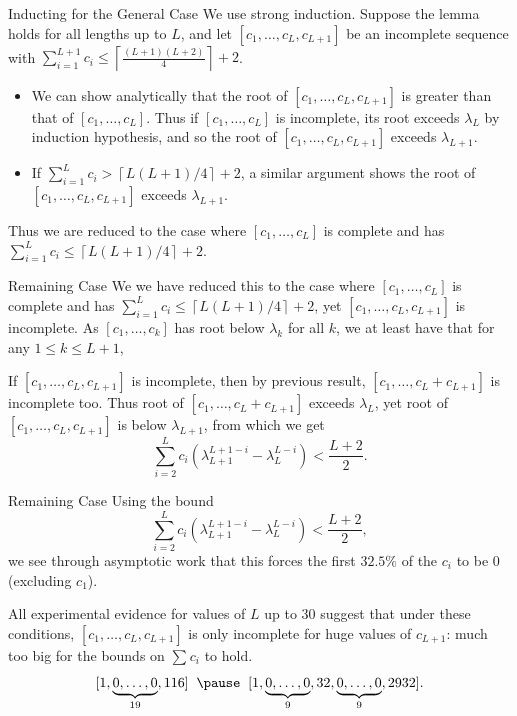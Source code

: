 \documentclass{beamer}
\begin{document}
\begin{frame}{Inducting for the General Case}
	We use strong induction. Suppose the lemma holds for all lengths up to $L$, and let $[c_1,\ldots , c_{L},c_{L+1}]$ be an incomplete sequence with $\sum_{i=1}^{L+1}c_{i}\leq \left\lceil \frac{\left( L+1 \right) \left( L+2 \right) }{4} \right\rceil +2$.
	\pause
	\begin{itemize}
	\item
		We can show analytically that the root of $[c_1,\ldots , c_{L},c_{L+1}]$ is greater than that of $[c_1,\ldots , c_{L}]$. Thus if $[c_1,\ldots , c_{L}]$ is incomplete, its root exceeds $\lambda _{L}$ by induction hypothesis, and so the root of $[c_1,\ldots , c_{L},c_{L+1}]$ exceeds $\lambda _{L+1}.$
		\pause
	\item
		If $\sum_{i=1}^{L}c_{i}>\left\lceil L(L+1)/4 \right\rceil +2$, a similar argument shows the root of $[c_1,\ldots , c_{L},c_{L+1}]$ exceeds $\lambda _{L+1}.$ 	
		\pause
	\end{itemize}
	Thus we are reduced to the case where $[c_1,\ldots , c_{L}]$ is complete and has $\sum_{i=1}^{L}c_{i}\leq \left\lceil L(L+1)/4 \right\rceil +2$.
\end{frame}
\begin{frame}{Remaining Case}
	We we have reduced this to the case where $[c_1,\ldots , c_{L}]$ is complete and has $\sum_{i=1}^{L}c_{i}\leq \left\lceil L(L+1)/4 \right\rceil +2$, yet $[c_1,\ldots ,c_{L}, c_{L+1}]$ is incomplete. \pause As $[c_1,\ldots , c_{k}]$ has root below $\lambda _{k}$ for all $k$, we at least have that for any $1\leq k\leq L+1$,
\begin{center}\end{center}
\pause
If $[c_1,\ldots , c_{L},c_{L+1}]$ is incomplete, then by previous result, $[c_1,\ldots , c_{L}+c_{L+1}]$ is incomplete too. Thus root of $[c_1,\ldots , c_{L}+c_{L+1}]$ exceeds $\lambda _{L}$, yet root of $[c_1,\ldots , c_{L}, c_{L+1}]$ is below $\lambda _{L+1}$, from which we get
\[
	\sum_{i=2}^{L}c_{i}\left( \lambda _{L+1}^{L+1-i}-\lambda _{L}^{L-i} \right) <\frac{L+2}{2}
.\] 
\end{frame}
\begin{frame}{Remaining Case}
	Using the bound
	\[
	\sum_{i=2}^{L}c_{i}\left( \lambda _{L+1}^{L+1-i}-\lambda _{L}^{L-i} \right) <\frac{L+2}{2}
,\] 
we see through asymptotic work that this forces the first $32.5 \%$ of the $c_{i}$ to be 0 (excluding $c_1$).
\pause

All experimental evidence for values of $L$ up to 30 suggest that under these conditions,  $[c_1,\ldots , c_{L},c_{L+1}]$ is only incomplete for huge values of $c_{L+1}$: much too big for the bounds on $\sum_{}^{}c_{i} $ to hold.
\pause
\[
	[1,\underbrace{0,\ldots , 0}_{19},116] \; \;  \pause \; \; [1,\underbrace{0,\ldots , 0}_{9},32,\underbrace{0,\ldots , 0}_{9},2932]
.\] 

\end{frame}
\end{document}
